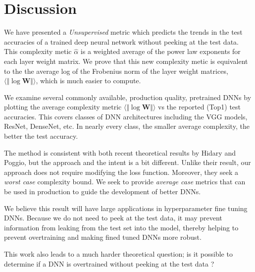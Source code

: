 \vspace{-4mm}
\section{Discussion}
\label{sxn:discussion}
\vspace{-3mm}

We have presented a \emph{Unsupervised} metric which  predicts the trends in the test accuracies of a trained deep neural network without peeking at the test data. This complexity metic $\hat{\alpha}$ is a weighted average of the power law exponents for each layer weight matrix. We prove that this new complexity metic  is equivalent to the the average log of the Frobenius norm of the layer weight matrices, $\langle\Vert\log\mathbf{W}\Vert\rangle$, which is much easier to compute.

We examine several  commonly available, production quality, pretrained DNNs  by plotting  the average complexity metric $\langle\Vert\log\mathbf{W}\Vert\rangle$ vs the reported (Top1) test accuracies. This covers classes of DNN architectures including the VGG models, ResNet, DenseNet, etc.  In nearly every class, the smaller average complexity, the better the test accuracy.

The method is consistent with both recent theoretical results by Hidary and Poggio, but the approach and the intent is a bit different. 
Unlike their result, our approach does not require modifying the loss function.
Moreover, they seek a \emph{worst case} complexity bound.  We seek to provide \emph{average case} metrics that can be used in production
to guide the development of better DNNs.

We believe this result will have large applications in hyperparameter fine tuning DNNs.  Because we do not need to peek at the test data, it may prevent information from leaking from the test set into the model, thereby helping to prevent overtraining and making fined tuned DNNs more robust.

This work also leads to a much harder theoretical question; is it possible to determine if a DNN is overtrained without peeking at the test data ?  